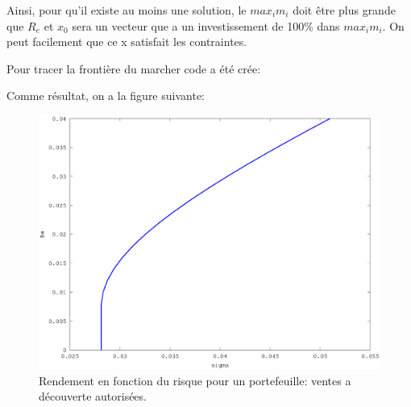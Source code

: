 \documentclass[a4paper,11pt]{article}
\begin{document}
Ainsi, pour  qu'il existe au  moins une solution,  le $max_i m_i$ doit  être plus
grande que $R_e$ et $x_0$ sera un  vecteur que a un investissement de 100\% dans
$max_i m_i$. On peut facilement que ce x  satisfait les contraintes.

Pour tracer la frontière du marcher code a été crée:

\begin{multicols}{2}
  
\end{multicols}
Comme résultat, on a la figure suivante:

\begin{figure}[h!]
  \begin{centering}
    \includegraphics[scale=0.4]{parte14.eps}
    \par\end{centering}
  \caption{Rendement  en  fonction du  risque  pour  un  portefeuille: ventes  a
    découverte autorisées.}
  \label{fig:jacobi-conv}
\end{figure}


\end{document}
